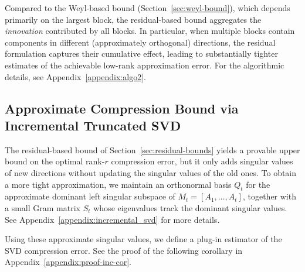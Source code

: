 \documentclass[10pt]{article} %
\begin{document}
Compared to the Weyl-based bound (Section~\ref{sec:weyl-bound}), which depends
primarily on the largest block, the residual-based bound aggregates the
\emph{innovation} contributed by all blocks. In particular, when multiple blocks
contain components in different (approximately orthogonal) directions, the
residual formulation captures their cumulative effect, leading to substantially
tighter estimates of the achievable low-rank approximation error. For the
algorithmic details, see Appendix~\ref{appendix:algo2}.


\subsection{Approximate Compression Bound via Incremental Truncated SVD}
\label{sec:approx-incremental}

The residual-based bound of Section~\ref{sec:residual-bounds} yields a
provable upper bound on the optimal rank-$r$ compression error, but it only adds singular values of new directions without updating the singular values of the old ones.
To obtain a more tight approximation, we maintain an orthonormal basis
$Q_t$ for the approximate dominant left singular subspace of
$M_t = [A_1,\dots,A_t]$, together with a small Gram matrix $S_t$ whose
eigenvalues track the dominant singular values.
See Appendix~\ref{appendix:incremental_svd} for more details.

Using these approximate singular values, we define a plug-in estimator of the
SVD compression error. See the proof of the following corollary in Appendix~\ref{appendix:proof-inc-cor}.
\end{document}
